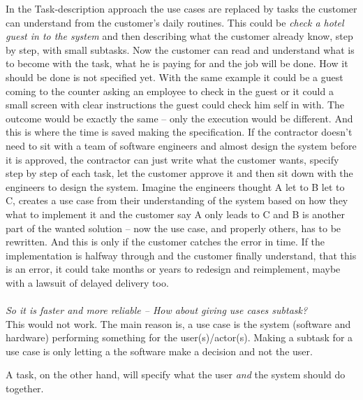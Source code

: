 \documentclass[Main]{subfiles}
\begin{document}
In the Task-description approach the use cases are replaced by tasks the customer can understand from the customer's daily routines.
This could be \textit{check a hotel guest in to the system} and then describing what the customer already know, step by step, with small subtasks.
Now the customer can read and understand what is to become with the task, what he is paying for and the job will be done.
How it should be done is not specified yet.
With the same example it could be a guest coming to the counter asking an employee to check in the guest or it could a small screen with clear instructions the guest could check him self in with.
The outcome would be exactly the same -- only the execution would be different.
And this is where the time is saved making the specification.
If the contractor doesn't need to sit with a team of software engineers and almost design the system before it is approved, the contractor can just write what the customer wants, specify step by step of each task, let the customer approve it and then sit down with the engineers to design the system.
Imagine the engineers thought A let to B let to C, creates a use case from their understanding of the system based on how they what to implement it and the customer say A only leads to C and B is another part of the wanted solution -- now the use case, and properly others, has to be rewritten.
And this is only if the customer catches the error in time. 
If the implementation is halfway through and the customer finally understand, that this is an error, it could take months or years to redesign and reimplement, maybe with a lawsuit of delayed delivery too.
\\
\\
\textit{So it is faster and more reliable -- How about giving use cases subtask?}
\\
This would not work.
The main reason is, a use case is the system (software and hardware) performing something for the user(s)/actor(s).
Making a subtask for a use case is only letting a the software make a decision and not the user.

A task, on the other hand, will specify what the user \textit{and} the system should do together.
\end{document}
